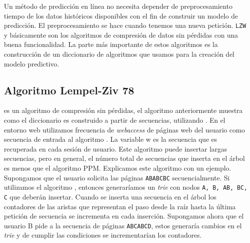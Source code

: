 Un método de predicción en línea no necesita depender de preprocesamiento tiempo de los datos históricos disponibles con el fin de construir un modelo de predicción. El preprocesamiento se hace cuando tenemos una nueva petición. \texttt{LZW} y \lzSieteOcho básicamente son los algoritmos de compresión de datos sin pérdidas con una buena funcionalidad. La parte más importante de estos algoritmos es la construcción de un diccionario de algoritmos que usamos para la creación del modelo predictivo. 






















\uncm
\subsection{Algoritmo Lempel-Ziv 78}






\lzSieteOcho es un algoritmo de compresión sin pérdidas, el algoritmo anteriormente muestra  como el diccionario es construido  a partir de secuencias, utilizando \lzSieteOcho. En el entorno web utilizamos frecuencia de \emph{webaccess} de páginas web del usuario como secuencia de entrada al algoritmo \lzSieteOcho. La variable w es la secuencia que es recuperada en cada sesión de usuario. Este algoritmo puede insertar largas secuencias, pero en general, el número total de secuencias que inserta en el árbol es menos que el algoritmo PPM. Explicamos este algoritmo con un ejemplo. Supongamos que el usuario solicita las páginas \texttt{ABABCBC} secuencialmente. Si utilizamos el algoritmo \lzSieteOcho, entonces generaríamos un \emph{trie} con nodos  \texttt{A, B, AB, BC, C} que deberán insertar. 
Cuando se inserta una secuencia en el árbol los contadores de las aristas que representan el paso desde la raíz hasta la última petición de secuencia se incrementa en cada inserción. Supongamos ahora que el usuario B pide a la secuencia de páginas \texttt{ABCABCD}, estos generaría cambios en el \emph{trie} y de cumplir las condiciones se incrementarían los contadores. 

